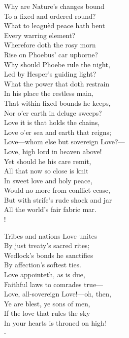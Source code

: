 \documentclass[12pt]{book}
\newenvironment{ipoem}[1]%
  {\setcounter{poemindentevery}{#1}\begin{poem}\small}%
  {\end{poem}\setcounter{poemindentevery}{0}}
\begin{document}
\begin{ipoem}{0}
    Why are Nature's changes bound \\
    To a fixed and ordered round? \\
    What to leaguèd peace hath bent \\
    Every warring element? \\
    Wherefore doth the rosy morn \\
    Rise on Phoebus' car upborne? \\
    Why should Phoebe rule the night, \\
    Led by Hesper's guiding light? \\
    What the power that doth restrain \\
    In his place the restless main, \\
    That within fixed bounds he keeps, \\
    Nor o'er earth in deluge sweeps? \\
    Love it is that holds the chains, \\
    Love o'er sea and earth that reigns; \\
    Love---whom else but sovereign Love?--- \\
    Love, high lord in heaven above! \\
    Yet should he his care remit, \\
    All that now so close is knit \\
    In sweet love and holy peace, \\
    Would no more from conflict cease, \\
    But with strife's rude shock and jar \\
    All the world's fair fabric mar. \\!

    Tribes and nations Love unites \\
    By just treaty's sacred rites; \\
    Wedlock's bonds he sanctifies \\
    By affection's softest ties. \\
    Love appointeth, as is due, \\
    Faithful laws to comrades true--- \\
    Love, all-sovereign Love!---oh, then, \\
    Ye are blest, ye sons of men, \\
    If the love that rules the sky \\
    In your hearts is throned on high! \\-
\end{ipoem}
\end{document}
